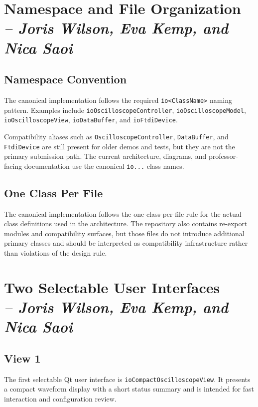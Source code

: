 \section{Namespace and File Organization \\
\small{\textit{-- Joris Wilson, Eva Kemp, and Nica Saoi}}}
\label{Section::Namespace and File Organization}

\subsection{Namespace Convention}
The canonical implementation follows the required \texttt{io<ClassName>} naming pattern. Examples include \texttt{ioOscilloscopeController}, \texttt{ioOscilloscopeModel}, \texttt{ioOscilloscopeView}, \texttt{ioDataBuffer}, and \texttt{ioFtdiDevice}.

Compatibility aliases such as \texttt{OscilloscopeController}, \texttt{DataBuffer}, and \texttt{FtdiDevice} are still present for older demos and tests, but they are not the primary submission path. The current architecture, diagrams, and professor-facing documentation use the canonical \texttt{io...} class names.

\subsection{One Class Per File}
The canonical implementation follows the one-class-per-file rule for the actual class definitions used in the architecture. The repository also contains re-export modules and compatibility surfaces, but those files do not introduce additional primary classes and should be interpreted as compatibility infrastructure rather than violations of the design rule.

\section{Two Selectable User Interfaces \\
\small{\textit{-- Joris Wilson, Eva Kemp, and Nica Saoi}}}
\label{Section::Two Selectable User Interfaces}

\subsection{View 1}
The first selectable Qt user interface is \texttt{ioCompactOscilloscopeView}. It presents a compact waveform display with a short status summary and is intended for fast interaction and configuration review.

